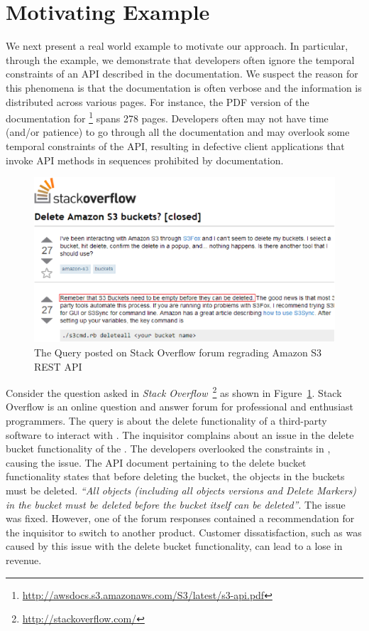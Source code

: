 \section{Motivating Example}
\label{sec:example}

We next present a real world example to motivate our approach.
In particular, through the example, we demonstrate that developers often ignore the temporal constraints of an API described in the documentation.
We suspect the reason for this phenomena is that the documentation is often verbose and the information is distributed across various pages.
For instance, the PDF version of the documentation for \amazonAPI\footnote{{\small \url{http://awsdocs.s3.amazonaws.com/S3/latest/s3-api.pdf}}} spans 278 pages.
Developers often may not have time (and/or patience) to go through all the documentation and may overlook some temporal constraints of the API,
resulting in defective client applications that invoke API methods in sequences prohibited by documentation. 

\begin{figure}[t]
	\begin{center}
		\includegraphics[scale=0.45]{Stackoverflow.eps}
	\end{center}
	\caption{\label{fig:Stackoverflow} The Query posted on Stack Overflow forum regrading Amazon S3 REST API}
\end{figure}

Consider the question asked in \textit{Stack Overflow}~\footnote{{\small \url{http://stackoverflow.com/}}} as shown in Figure~\ref{fig:Stackoverflow}.
Stack Overflow is an online question and answer forum for professional and enthusiast programmers.
The query is about the delete functionality of a third-party software  to interact with \amazonAPI.
The inquisitor complains about an issue in the delete bucket functionality of the .
The  developers overlooked the constraints in \amazon, causing the issue.
The API document pertaining to the  delete bucket functionality states that before deleting the bucket, the objects in the buckets must be deleted.
\textit{``All objects (including all objects versions and Delete Markers) in the bucket must be deleted before the bucket itself can be deleted''}.
The issue was fixed.
However, one of the forum responses contained a recommendation for the inquisitor to switch to another product.
Customer dissatisfaction, such as was caused by this issue with the delete bucket functionality, can lead to a lose in revenue.
 
